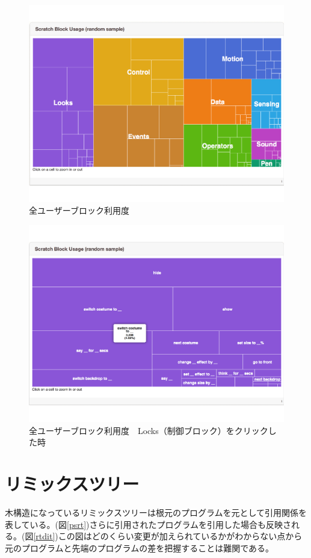 \documentclass[a4paper,10pt,onecolumn,oneside,openany]{jsbook}
\begin{document}
\begin{figure}[ht]
  \centering
    \includegraphics[scale=0.5]{graphic/scratch_block0.pdf}
  \caption{全ユーザーブロック利用度}
  \label{blockan}
 \end{figure}
 
 \begin{figure}[ht]
  \centering
    \includegraphics[scale=0.5]{graphic/scratch_block.pdf}
  \caption{全ユーザーブロック利用度　Locks（制御ブロック）をクリックした時}
  \label{blockdit}
 \end{figure}
 
 
\newpage
\section{リミックスツリー}
木構造になっているリミックスツリーは根元のプログラムを元として引用関係を表している。(図\ref{psrt})さらに引用されたプログラムを引用した場合も反映される。(図\ref{rtdit})この図はどのくらい変更が加えられているかがわからない点から元のプログラムと先端のプログラムの差を把握することは難関である。
\end{document}
